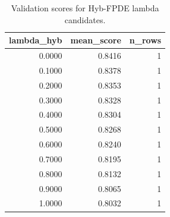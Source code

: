 \begin{table}[t]
\caption{Validation scores for Hyb-FPDE lambda candidates.}
\label{tab:lambda_distribution_computed}
\centering
\begin{tabular}{rrr}
\toprule
lambda\_hyb & mean\_score & n\_rows \\
\midrule
0.0000 & 0.8416 & 1 \\
0.1000 & 0.8378 & 1 \\
0.2000 & 0.8353 & 1 \\
0.3000 & 0.8328 & 1 \\
0.4000 & 0.8304 & 1 \\
0.5000 & 0.8268 & 1 \\
0.6000 & 0.8240 & 1 \\
0.7000 & 0.8195 & 1 \\
0.8000 & 0.8132 & 1 \\
0.9000 & 0.8065 & 1 \\
1.0000 & 0.8032 & 1 \\
\bottomrule
\end{tabular}

\end{table}
